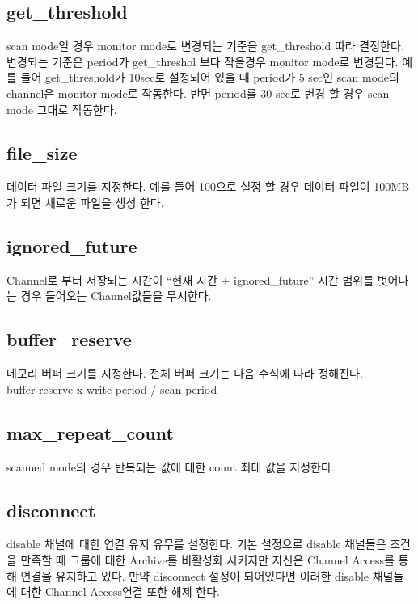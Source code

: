 \documentclass[11pt
  , a4paper
  , article
  , oneside
]{memoir}
\begin{document}
\subsection{get\_threshold}
scan mode일 경우 monitor mode로 변경되는 기준을 get\_threshold 따라 결정한다.
변경되는 기준은 period가 get\_threshol 보다 작을경우 monitor mode로 변경된다.
예를 들어 get\_threshold가 10sec로 설정되어 있을 때 period가 5 sec인 scan mode의 
channel은 monitor mode로 작동한다. 반면 period를 30 sec로 변경 할 경우 scan mode 그대로
작동한다.
\subsection{file\_size}
데이터 파일 크기를 지정한다. 예를 들어 100으로 설정 할 경우 데이터 파일이 100MB가 되면
새로운 파일을 생성 한다.

\subsection{ignored\_future}
Channel로 부터 저장되는 시간이 ``현재 시간 + ignored\_future'' 시간 범위를 벗어나는 경우
들어오는 Channel값들을 무시한다. 

\subsection{buffer\_reserve}
메모리 버퍼 크기를 지정한다. 전체 버퍼 크기는 다음 수식에 따라 정해진다.\\
\newline
buffer reserve x write period / scan period
\newline

\subsection{max\_repeat\_count}
scanned mode의 경우 반복되는 값에 대한 count 최대 값을 지정한다. 

\subsection{disconnect}
disable 채널에 대한 연결 유지 유무를 설정한다. 기본 설정으로 disable 채널들은
조건을 만족할 때 그룹에 대한 Archive를 비활성화 시키지만 자신은 Channel Access를 통해
연결을 유지하고 있다. 만약 disconnect 설정이 되어있다면 이러한 disable 채널들에 대한
Channel Access연결 또한 해제 한다.
\end{document}
